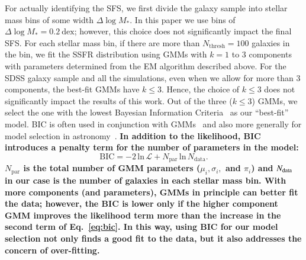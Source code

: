 \documentclass[tighten, preprint]{aastex62}
\begin{document}
For actually identifying the SFS, we first divide the galaxy 
sample into stellar mass bins of some width $\Delta \log M_*$. In this paper 
we use bins of $\Delta \log M_* = 0.2\ \mathrm{dex}$; however, this 
choice does not significantly impact the final SFS. For each stellar 
mass bin, if there are more than $N_\mathrm{thresh}{=}100$ galaxies in the bin, 
we fit the SSFR distribution using GMMs with $k{=}1$ to 3 components with 
parameters determined from the EM algorithm described above. 
For the SDSS galaxy sample and all the simulations, even when we 
allow for more than 3 components, the best-fit GMMs have $k\leq3$. Hence, the 
choice of $k\leq3$ does not significantly impact the results of this work.
Out of the three ($k\leq3$) GMMs, we select the one with the lowest Bayesian 
Information Criteria~\citep[BIC;][]{schwarz1978} as our ``best-fit'' model. 
BIC is often used in conjunction with
GMMs~\citep[\emph{e.g.}][]{leroux1992,roeder1997,fraley1998,steele2010performance} 
and also more generally for model selection in 
astronomy~\citep[\emph{e.g.}][]{liddle2007,broderick2011,vakili2016}.
{\bf \color{red}
In addition to the likelihood, BIC introduces a penalty term for the number
of parameters in the model:
\begin{equation} \label{eq:bic}
\mathrm{BIC} = -2\,\mathrm{ln}\,\mathcal{L} + N_\mathrm{par}\,\mathrm{ln}\,N_\mathrm{data}.     
\end{equation}
$N_\mathrm{par}$ is the total number of GMM parameters ($\mu_i, 
\sigma_i,$  and $\pi_i$) and $N_{\rm data}$ in our case is the 
number of galaxies in each stellar mass bin. With more components 
(and parameters), GMMs in principle can better fit the data; however, 
the BIC is lower only if the higher component GMM improves the likelihood
term more than the increase in the second term of Eq.~\ref{eq:bic}. 
In this way, using BIC for our model selection not only finds a good 
fit to the data, but it also addresses the concern of over-fitting. 
} 
\end{document}
